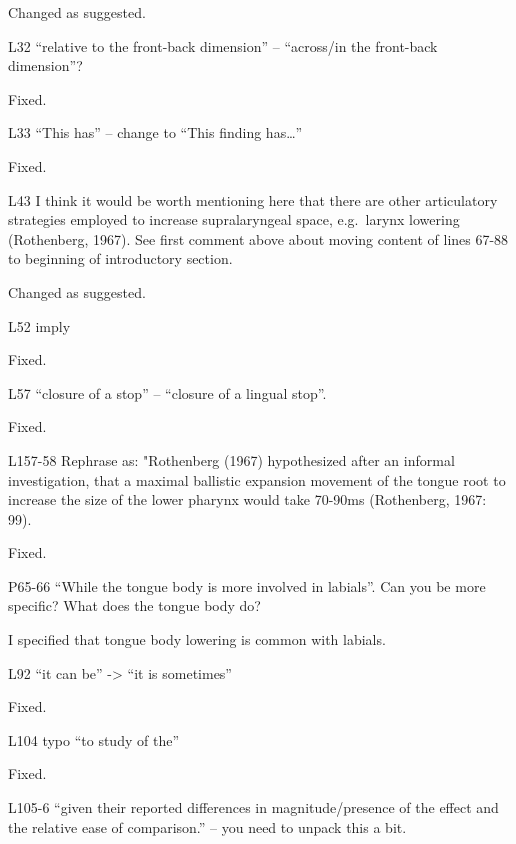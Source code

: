 \documentclass[]{article}
\begin{document}
Changed as suggested. \color{black}

L32 ``relative to the front-back dimension'' -- ``across/in the
front-back dimension''?

\color{plum}

Fixed. \color{black}

L33 ``This has'' -- change to ``This finding has\ldots{}''

\color{plum}

Fixed. \color{black}

L43 I think it would be worth mentioning here that there are other
articulatory strategies employed to increase supralaryngeal space,
e.g.~larynx lowering (Rothenberg, 1967). See first comment above about
moving content of lines 67-88 to beginning of introductory section.

\color{plum}

Changed as suggested. \color{black}

L52 imply

\color{plum}

Fixed. \color{black}

L57 ``closure of a stop'' -- ``closure of a lingual stop''.

\color{plum}

Fixed. \color{black}

L157-58 Rephrase as: "Rothenberg (1967) hypothesized after an informal
investigation, that a maximal ballistic expansion movement of the tongue
root to increase the size of the lower pharynx would take 70-90ms
(Rothenberg, 1967: 99).

\color{plum}

Fixed. \color{black}

P65-66 ``While the tongue body is more involved in labials''. Can you be
more specific? What does the tongue body do?

\color{plum}

I specified that tongue body lowering is common with labials.
\color{black}

L92 ``it can be'' -\textgreater{} ``it is sometimes''

\color{plum}

Fixed. \color{black}

L104 typo ``to study of the''

\color{plum}

Fixed. \color{black}

L105-6 ``given their reported differences in magnitude/presence of the
effect and the relative ease of comparison.'' -- you need to unpack this
a bit.
\end{document}
